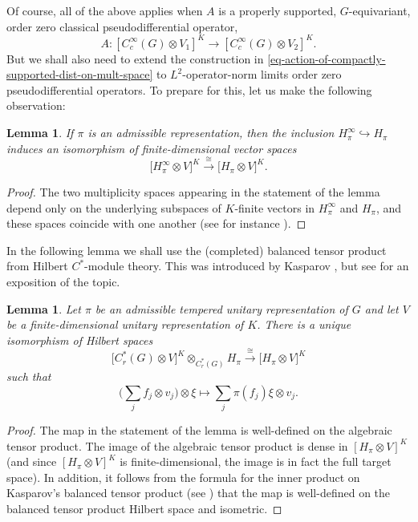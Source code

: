\documentclass[leqno,11pt]{amsart}
\numberwithin{equation}{subsection}
\theoremstyle{plain}
\newtheorem{lemma}[equation]{Lemma}
\theoremstyle{definition}
\theoremstyle{remark}
\begin{document}
Of course, all of the above applies  when $A$ is a properly supported, $G$-equivariant, order zero  classical pseudodifferential operator,
\begin{equation}
    \label{eq-psdo-for-discussion-of-fourier-transform}
A \colon [C_c^\infty (G) \otimes V_1]^K \longrightarrow [C_c^\infty (G) \otimes V_2]^K .
\end{equation} 
But we shall also need to extend the construction in \eqref{eq-action-of-compactly-supported-dist-on-mult-space} to $L^2$-operator-norm limits  order zero pseudodifferential operators.  To prepare for this, let us make the following observation: 

 

\begin{lemma}
If $\pi$ is an admissible  representation, then   the inclusion $H^\infty _\pi\hookrightarrow  H_\pi$  induces an isomorphism of finite-dimensional vector spaces
 \[
 \bigl [ H_\pi^\infty  \otimes V\bigr ] ^K\stackrel{\cong}\longrightarrow \bigl [ H_\pi \otimes V\bigr ] ^K .
 \]
 \end{lemma}


 \begin{proof}
The two multiplicity spaces appearing in the statement of the lemma depend only on the underlying subspaces of $K$-finite vectors  in $H_\pi^\infty$ and $H_\pi$, and  these spaces coincide with one another (see for instance \cite[Prop.\ VIII.8.5]{KnappOverview}).
 \end{proof}

 
In the following lemma we shall use  the (completed) balanced tensor product from Hilbert $C^*$-module theory. This was introduced by Kasparov \cite[Sec.~2.8]{Kasparov80}, but see \cite{Lance95} for an exposition of the topic. 

 

\begin{lemma}
\label{lem-balanced-kasparov-tensor-product}
    Let $\pi$ be an admissible tempered unitary representation of $G$ and let $V$ be a finite-dimensional unitary representation of $K$.  There is a unique isomorphism of Hilbert spaces
    \[
\bigl [ C_r^*(G) \otimes V\bigr ] ^K \otimes_{C^*_r(G)} H_\pi  \stackrel \cong  \longrightarrow \bigl [ H_\pi \otimes V\bigr ] ^K
\]
such that 
\[
\bigl (  \sum _j f_j \otimes v_j \bigr )  \otimes \xi \longmapsto  \sum _j \pi(f_j)\xi \otimes v_j .
\]
\end{lemma}

\begin{proof} 
The map in the statement of the lemma is well-defined on the algebraic tensor product. The image of the algebraic tensor product is dense in  $ [ H_\pi \otimes V] ^K$ (and since $ [ H_\pi \otimes V] ^K$ is finite-dimensional, the image is in fact the full target space).  In addition, it follows from the formula for the inner product on Kasparov's balanced tensor product (see \cite[(4.4)]{Lance95}) that the map is  well-defined on the balanced tensor product Hilbert space and isometric.
\end{proof}
\end{document}
